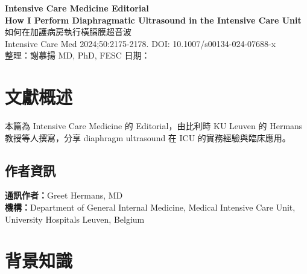 \documentclass[12pt,a4paper]{article}
\begin{document}
\begin{center}
{\LARGE\bfseries\textcolor{emergency_red}{Intensive Care Medicine Editorial}}\\[0.5cm]
{\Large\textbf{How I Perform Diaphragmatic Ultrasound in the Intensive Care Unit}}\\[0.3cm]
{\large 如何在加護病房執行橫膈膜超音波}\\[0.5cm]
{\normalsize Intensive Care Med 2024;50:2175-2178. DOI: 10.1007/s00134-024-07688-x}\\[0.3cm]
{\normalsize 整理：謝慕揚 MD, PhD, FESC \quad 日期：\mydate}
\end{center}


\tableofcontents
\newpage

\section{文獻概述}

本篇為 Intensive Care Medicine 的 Editorial，由比利時 KU Leuven 的 Hermans 教授等人撰寫，分享 diaphragm ultrasound 在 ICU 的實務經驗與臨床應用。

\subsection{作者資訊}
\textbf{通訊作者：}Greet Hermans, MD\\
\textbf{機構：}Department of General Internal Medicine, Medical Intensive Care Unit, University Hospitals Leuven, Belgium

\section{背景知識}
\end{document}
